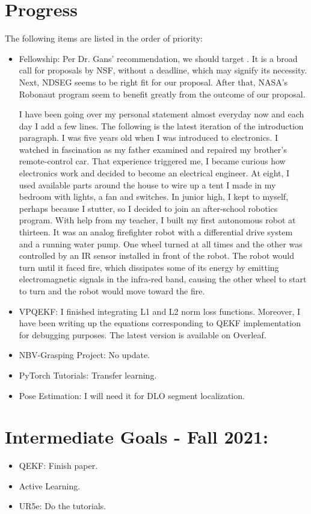 \documentclass[11pt]{article}
\begin{document}
\section{Progress}
The following items are listed in the order of priority:
\begin{itemize}
      \item Fellowship:  Per Dr. Gans' recommendation, we should target \cite{AM_Opt}. It is a
      broad call for proposals by NSF, without a deadline, which may signify its necessity. Next, NDSEG \cite{NDSEG27}
      seems to be right fit for our proposal. After that, NASA's Robonaut program \cite{Robonaut95:online} seem to benefit
      greatly from the outcome of our proposal.

      I have been going over my personal statement almost everyday now and
      each day I add a few lines. The following is the latest iteration of the introduction
      paragraph. I was five years old when I was introduced to electronics.
      I watched in fascination as my father examined and repaired my brother's
      remote-control car. That experience triggered me, I became curious how electronics
      work and decided to become an electrical engineer.
      At eight, I used available
      parts around the house to wire up a tent I made in my bedroom with lights, a fan
      and switches. In junior high, I kept to myself, perhaps because I
      stutter, so I decided to join an after-school robotics program. With help from my
      teacher, I built my first autonomous robot at thirteen. It was an analog firefighter
      robot with a differential drive system and a running water pump. One wheel turned at all times
      and the other was controlled by an IR sensor installed in front of the robot. The
      robot would turn until it faced fire, which dissipates some of its energy by
      emitting electromagnetic signals in the infra-red band, causing the other
      wheel to start to turn and the robot would
      move toward the fire.
      \item VPQEKF: I finished integrating L1 and L2 norm loss functions. Moreover, I
      have been writing up the equations corresponding to QEKF implementation
      for debugging purposes. The latest version is available on Overleaf.
      \item NBV-Grasping Project: No update.
      \item PyTorch Tutorials: Transfer learning.
      \item Pose Estimation: I will need it for DLO segment localization.
\end{itemize}


\section{Intermediate Goals - Fall 2021:}
\begin{itemize}
      \item QEKF: Finish paper.
      \item Active Learning.
      \item UR5e: Do the tutorials.
\end{itemize}


\newpage


\end{document}
